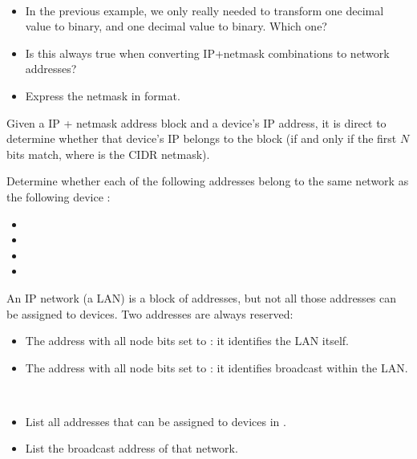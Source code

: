 \begin{exercise}\ \\[-0.5cm]
\begin{itemize}
\item In the previous example, we only really needed to transform one decimal value to binary,
and one decimal value to binary. Which one?
\item Is this always true when converting IP+netmask combinations to network addresses?
\item Express the netmask in  format.
\end{itemize}
\end{exercise}



Given a IP + netmask address block and a device's IP address, it is direct to determine 
whether that device's IP belongs to the block (if and only if the first $N$ bits match,
where  is the CIDR netmask).

\begin{exercise}
Determine whether each of the following addresses belong to the same network as
the following device :
\begin{itemize}
\item {}
\item {}
\item {}
\item {}
\end{itemize}
\end{exercise}

An IP network (a LAN) is a block of addresses, but not all those addresses 
can be assigned to devices. Two addresses are always reserved:
\begin{itemize}
\item The address with all node bits set to : it identifies the LAN itself.
\item The address with all node bits set to : it identifies broadcast within the LAN.
\end{itemize}

\begin{exercise}\ \\[-0.5cm]
\begin{itemize}
\item List all addresses that can be assigned to devices in .
\item List the broadcast address of that network.
\end{itemize}
\end{exercise}

